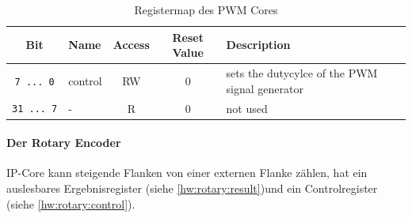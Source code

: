 \begin{table}
\begin{longtable}[]{@{}c|l|c|c|l@{}}
	\textbf{Bit} & \textbf{Name} & \textbf{Access} & \textbf{Reset Value} &
	\textbf{Description}\tabularnewline

	\endhead
	\texttt{7\ ...\ 0} & control & RW & 0 & sets the dutycylce of the PWM
	signal generator\tabularnewline
	\texttt{31\ ...\ 7} & - & R & 0 & not used\tabularnewline

\end{longtable} 
\caption{Registermap des PWM Cores}
\label{hw:pwm}
\end{table}

\paragraph{Der Rotary Encoder} \ac{IP}-Core kann steigende Flanken von einer externen Flanke zählen, hat ein auslesbares Ergebnisregister (siehe \ref{hw:rotary:result})und ein Controlregister (siehe \ref{hw:rotary:control}).

